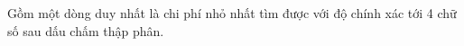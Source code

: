 Gồm một dòng duy nhất là chi phí nhỏ nhất tìm được với độ chính xác tới 4 chữ số sau dấu chấm thập phân.